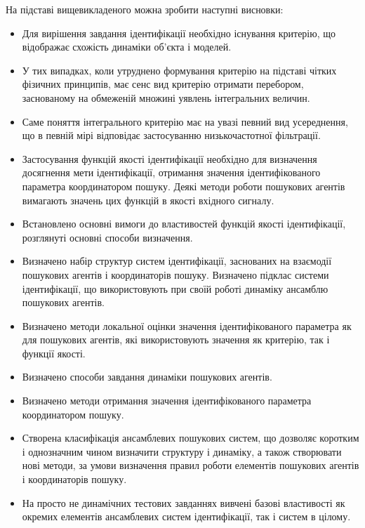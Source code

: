 На підставі вищевикладеного можна зробити наступні висновки:

\begin{itemize}

  \item
    Для вирішення завдання ідентифікації необхідно існування
    критерію, що відображає схожість динаміки об'єкта і моделей.

  \item
    У тих випадках, коли утруднено формування критерію на
    підставі чітких фізичних принципів, має сенс вид критерію
    отримати перебором, заснованому на обмеженій множині уявлень
    інтегральних величин.

  \item
    Саме поняття інтегрального критерію має на увазі певний
    вид усереднення, що в певній мірі відповідає застосуванню
    низькочастотної фільтрації.

  \item
    Застосування функцій якості ідентифікації необхідно для
    визначення досягнення мети ідентифікації, отримання значення
    ідентифікованого параметра координатором пошуку. Деякі методи
    роботи пошукових агентів вимагають значень цих функцій в якості
    вхідного сигналу.

  \item
    Встановлено основні вимоги до властивостей функцій якості
    ідентифікації, розглянуті основні способи визначення.

  \item
    Визначено набір структур систем ідентифікації, заснованих на
    взаємодії пошукових агентів і координаторів пошуку. Визначено
    підклас системи ідентифікації, що використовують при своїй
    роботі динаміку ансамблю пошукових агентів.

  \item
    Визначено методи локальної оцінки значення ідентифікованого
    параметра як для пошукових агентів, які використовують значення
    як критерію, так і функції якості.

  \item
    Визначено способи завдання динаміки пошукових агентів.

  \item
    Визначено методи отримання значення ідентифікованого параметра
    координатором пошуку.

  \item
    Створена класифікація ансамблевих пошукових систем, що дозволяє
    коротким і однозначним чином визначити структуру і динаміку,
    а також створювати нові методи, за умови визначення правил
    роботи елементів пошукових агентів і координаторів пошуку.

  \item
    На просто не динамічних тестових завданнях вивчені базові
    властивості як окремих елементів ансамблевих систем
    ідентифікації, так і систем в цілому.


\end{itemize}

